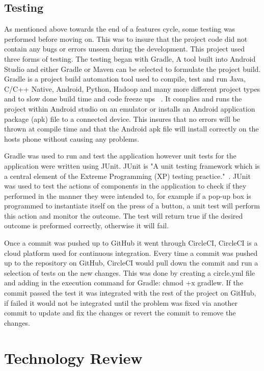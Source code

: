 \pagebreak
\section{Testing}
As mentioned above towards the end of a features cycle, some testing was performed before moving on. This was to insure that the project code did not contain any bugs or errors unseen during the development. This project used three forms of testing. The testing began with Gradle, A tool built into Android Studio and either Gradle or Maven can be selected to formulate the project build. Gradle is a project build automation tool used to compile, test and run Java, C/C++ Native, Android, Python, Hadoop and many more different project types and to slow done build time and code freeze ups ~\cite{gradle}. It complies and runs the project within Android studio on an emulator or installs an Android application package (apk) file to a connected device. This insures that no errors will be thrown at compile time and that the Android apk file will install correctly on the hosts phone without causing any problems. 

Gradle was used to run and test the application however unit tests for the application were written using JUnit. JUnit is "A unit testing framework which is a central element of the Extreme Programming (XP) testing practice."~\cite{junit}. JUnit was used to test the actions of components in the application to check if they performed in the manner they were intended to, for example if a pop-up box is programmed to instantiate itself on the press of a button, a unit test will perform this action and monitor the outcome. The test will return true if the desired outcome is preformed correctly, otherwise it will fail.

Once a commit was pushed up to GitHub it went through CircleCI, CircleCI is a cloud platform used for continuous integration. Every time a commit was pushed up to the repository on GitHub, CircleCI would pull down the commit and run a selection of tests on the new changes. This was done by creating a circle.yml file and adding in the execution command for Gradle: chmod +x gradlew. If the commit passed the test it was integrated with the rest of the project on GitHub, if failed it would not be integrated until the problem was fixed via another commit to update and fix the changes or revert the commit to remove the changes.

\chapter{Technology Review}


